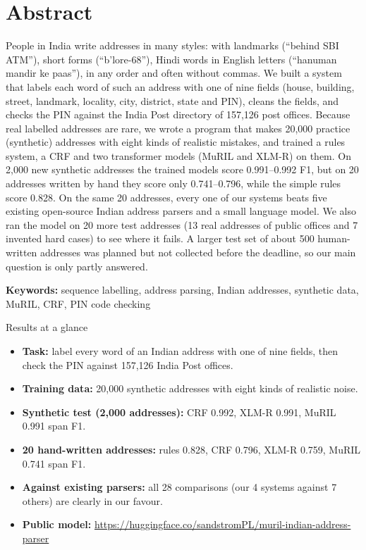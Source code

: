 \documentclass[11pt,a4paper]{article}
\begin{document}
\pagestyle{front}

\section*{Abstract}
People in India write addresses in many styles: with landmarks (``behind SBI ATM''), short forms (``b'lore-68''),
Hindi words in English letters (``hanuman mandir ke paas''), in any order and often without commas. We built a system
that labels each word of such an address with one of nine fields (house, building, street, landmark, locality, city,
district, state and PIN), cleans the fields, and checks the PIN against the India Post directory of 157,126 post
offices. Because real labelled addresses are rare, we wrote a program that makes 20,000 practice (synthetic) addresses
with eight kinds of realistic mistakes, and trained a rules system, a CRF and two transformer models (MuRIL and \mbox{XLM-R})
on them. On 2,000 new synthetic addresses the trained models score 0.991--0.992 F1, but on 20 addresses written by hand
they score only 0.741--0.796, while the simple rules score 0.828. On the same 20 addresses, every one of our systems
beats five existing open-source Indian address parsers and a small language model. We also ran the model on 20 more
test addresses (13 real addresses of public offices and 7 invented hard cases) to see where it fails. A larger test set
of about 500 human-written addresses was planned but not collected before the deadline, so our main question is only
partly answered.

\medskip
\noindent\textsf{\textbf{\color{brand}Keywords:}} sequence labelling, address parsing, Indian addresses, synthetic
data, MuRIL, CRF, PIN code checking

\bigskip
\begin{keybox}{Results at a glance}
\begin{itemize}[leftmargin=1.2em, itemsep=3pt]
\item \textbf{Task:} label every word of an Indian address with one of nine fields, then check the PIN against
157,126 India Post offices.
\item \textbf{Training data:} 20,000 synthetic addresses with eight kinds of realistic noise.
\item \textbf{Synthetic test (2,000 addresses):} CRF 0.992, \mbox{XLM-R} 0.991, MuRIL 0.991 span F1.
\item \textbf{20 hand-written addresses:} rules 0.828, CRF 0.796, \mbox{XLM-R} 0.759, MuRIL 0.741 span F1.
\item \textbf{Against existing parsers:} all 28 comparisons (our 4 systems against 7 others) are clearly in our
favour.
\item \textbf{Public model:} \url{https://huggingface.co/sandstromPL/muril-indian-address-parser}
\end{itemize}
\end{keybox}
\end{document}
